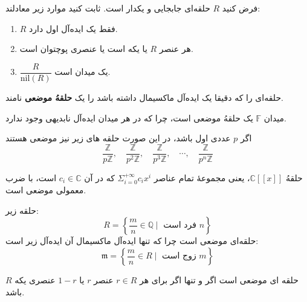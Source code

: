 \section{}

\begin{exercise}
    فرض کنید \( R \) حلقه‌ای جابجایی و یکدار است. ثابت کنید موارد زیر معادلند:
    \begin{enumerate}
        \item \( R \) فقط یک ایده‌آل اول دارد.
        \item هر عنصر  \( R \) یا یکه است یا عنصری پوچتوان است.
        \item \( \dfrac{R}{\mathrm{nil}(R)} \) یک میدان است.
    \end{enumerate}
\end{exercise}

\begin{definition}
    حلقه‌ای را که دقیقا یک ایده‌آل ماکسیمال داشته باشد را یک
    \textbf{حلقهُ موضعی}
    نامند.
\end{definition}

\begin{example}
    میدان
    \(\mathbb{F} \)
    یک حلقهُ موضعی است،
    چرا که در هر میدان ایده‌آل نابدیهی وجود ندارد.
\end{example}

\begin{example}
    اگر
    \(p\)
    عددی اول باشد،‌ در این صورت حلقه های زیر نیز موضعی هستند
    \[\frac{\mathbb{Z}}{p\mathbb{Z}}, \quad\frac{\mathbb{Z}}{p^2\mathbb{Z}}, \quad\frac{\mathbb{Z}}{p^3\mathbb{Z}}, \quad\cdots,\quad \frac{\mathbb{Z}}{p^n\mathbb{Z}}\]
\end{example}


\begin{example}
    حلقهُ
    \(\mathbb{C}[[x]]\)،
    یعنی مجموعهٔ تمام عناصر
    \(\Sigma_{i=0}^{+\infty} c_ix^i\)
    که در آن
    \(c_i \in \mathbb{C}\)
    است، با ضرب معمولی موضعی است.
\end{example}


\begin{example}
    حلقه زیر:
    \[
        R = \left\{ \frac{m}{n} \in \mathbb{Q} \mid \text{ فرد است } n \right\}
    \]
    حلقه‌ای موضعی است چرا که تنها ایده‌آل ماکسیمال آن ایده‌آل زیر است:
    \[
        \mathfrak{m} = \left\{ \frac{m}{n} \in R \mid \text{ زوج است } m \right\}
    \]
\end{example}


\begin{theorem}
    \(R\)
    حلقه ای موضعی است اگر و تنها اگر برای هر
    \(r\in R\)
    عنصر
    \(r\)
    یا
    \(1-r\)
    عنصری یکه باشد.
\end{theorem}

